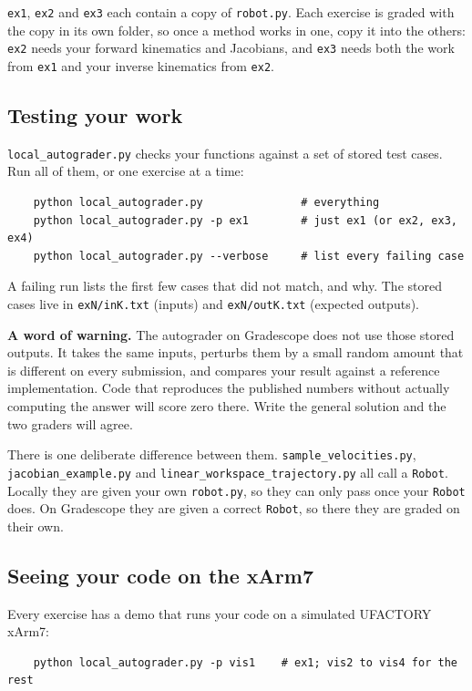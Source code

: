 \documentclass{16384_doc}
\begin{document}
\verb!ex1!, \verb!ex2! and \verb!ex3! each contain a copy of \verb!robot.py!.
Each exercise is graded with the copy in its own folder, so once a method works
in one, copy it into the others: \verb!ex2! needs your forward kinematics and
Jacobians, and \verb!ex3! needs both the work from \verb!ex1! and your inverse kinematics from \verb!ex2!.

\subsection*{Testing your work}

\verb!local_autograder.py! checks your functions against a set of stored test
cases. Run all of them, or one exercise at a time:

\begin{verbatim}
    python local_autograder.py               # everything
    python local_autograder.py -p ex1        # just ex1 (or ex2, ex3, ex4)
    python local_autograder.py --verbose     # list every failing case
\end{verbatim}

A failing run lists the first few cases that did not match, and why. The stored
cases live in \verb!exN/inK.txt! (inputs) and \verb!exN/outK.txt! (expected
outputs).

\textbf{A word of warning.} The autograder on Gradescope does not use those
stored outputs. It takes the same inputs, perturbs them by a small random
amount that is different on every submission, and compares your result against
a reference implementation. Code that reproduces the published numbers without
actually computing the answer will score zero there. Write the general solution
and the two graders will agree.

There is one deliberate difference between them. \verb!sample_velocities.py!,
\verb!jacobian_example.py! and \verb!linear_workspace_trajectory.py! all call a
\verb!Robot!. Locally they are given your own \verb!robot.py!, so they can only
pass once your \verb!Robot! does. On Gradescope they are given a correct
\verb!Robot!, so there they are graded on their own.

\subsection*{Seeing your code on the xArm7}

Every exercise has a demo that runs your code on a simulated UFACTORY xArm7:

\begin{verbatim}
    python local_autograder.py -p vis1    # ex1; vis2 to vis4 for the rest
\end{verbatim}
\end{document}
